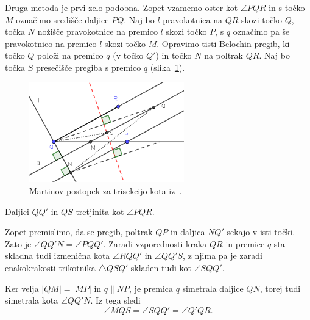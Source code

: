 Druga metoda je prvi zelo podobna. Zopet vzamemo oster kot $\angle PQR$ in s točko $M$ označimo središče daljice $PQ$. Naj bo $l$ pravokotnica na $QR$ skozi točko $Q$, točka $N$ nožišče pravokotnice na premico $l$ skozi točko $P$, s $q$ označimo pa še pravokotnico na premico $l$ skozi točko $M$. Opravimo tisti Belochin pregib, ki točko $Q$ položi na premico $q$ (v točko $Q'$) in točko $N$ na poltrak $QR$. Naj bo točka $S$ presečišče pregiba s premico $q$ (slika~\ref{fig:trisection_10.14}).

\begin{figure}[h]
    \centering
    \includegraphics[width=0.6\textwidth]{images/starogr_problemi/trisection_10.14.png}
    \caption[Martinova trisekcija ostrega kota (metoda $2$)]{Martinov postopek za trisekcijo kota iz~\cite[str.\ 158--159]{geometricconstructions}.}
    \label{fig:trisection_10.14}
\end{figure}

\begin{trditev}
    Daljici $QQ'$ in $QS$ tretjinita kot $\angle PQR$.
\end{trditev}
\begin{dokaz}
    Zopet premislimo, da se pregib, poltrak $QP$ in daljica $NQ'$ sekajo v isti točki. Zato je $\angle QQ'N = \angle PQQ'$. Zaradi vzporednosti kraka $QR$ in premice $q$ sta skladna tudi izmenična kota $\angle RQQ'$ in $\angle QQ'S$, z njima pa je zaradi enakokrakosti trikotnika $\triangle QSQ'$ skladen tudi kot $\angle SQQ'$.

    Ker velja $|QM| = |MP|$ in $q \parallel NP$, je premica $q$ simetrala daljice $QN$, torej tudi simetrala kota $\angle QQ'N$. Iz tega sledi
    $$ \angle MQS = \angle SQQ' = \angle Q'QR.$$
\end{dokaz}